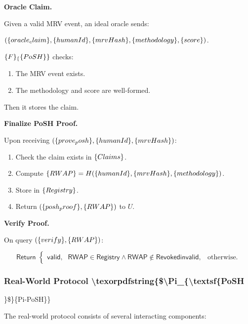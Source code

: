 \documentclass{article}
\begin{document}
\textbf{Oracle Claim.}

Given a valid MRV event, an ideal oracle sends:

$(\textsf\{oracle_claim\}, \mathsf\{humanId\}, \mathsf\{mrvHash\}, \mathsf\{methodology\}, \mathsf\{score\})$.

$\mathcal\{F\}_\{\textsf\{PoSH\}\}$ checks:

\begin{enumerate}
\item The MRV event exists.
\item The methodology and score are well-formed.
\end{enumerate}

Then it stores the claim.

\textbf{Finalize PoSH Proof.}

Upon receiving $(\textsf\{prove_posh\}, \mathsf\{humanId\}, \mathsf\{mrvHash\})$:

\begin{enumerate}
\item Check the claim exists in $\mathsf\{Claims\}$.
\item Compute $\mathsf\{RWAP\} = H(\mathsf\{humanId\}, \mathsf\{mrvHash\}, \mathsf\{methodology\})$.
\item Store in $\mathsf\{Registry\}$.
\item Return $(\textsf\{posh_proof\}, \mathsf\{RWAP\})$ to $U$.
\end{enumerate}

\textbf{Verify Proof.}

On query $(\textsf\{verify\}, \mathsf\{RWAP\})$:

\begin{equation}
\textsf{Return } 
  \begin{cases}
  \textsf{valid}, & \mathsf{RWAP} \in \mathsf{Registry} \land \mathsf{RWAP} \notin \mathsf{Revoked} 

  \textsf{invalid}, & \text{otherwise.}
  \end{cases}
\end{equation}

\subsubsection{Real-World Protocol {\textbackslash}texorpdfstring\{\${\textbackslash}Pi\_\{{\textbackslash}textsf\{PoSH}

\}\$\}\{Pi-PoSH\}\}

The real-world protocol consists of several interacting components:
\end{document}
